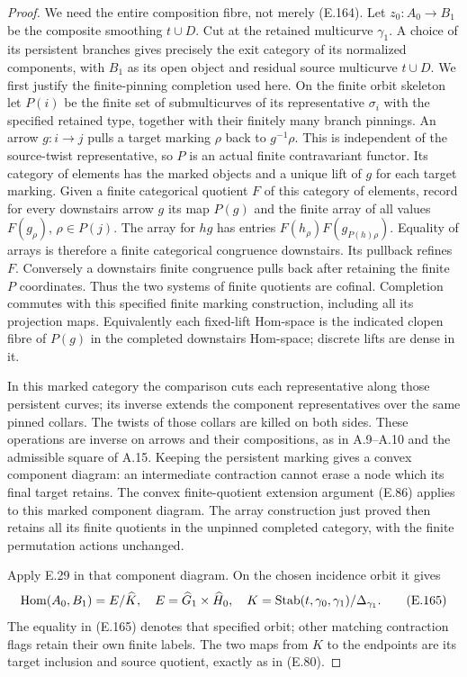 \begin{proof}
We need the entire composition fibre, not merely (E.164).
Let $z_0:A_0\to B_1$ be the composite smoothing $t\cup D$.
Cut at the retained multicurve $\gamma_1$.  A choice of its
persistent branches gives precisely the exit category of its
normalized components, with $B_1$ as its open object and residual
source multicurve $t\cup D$.  We first justify the finite-pinning completion used here.  On
the finite orbit skeleton let $P(i)$ be the finite set of
submulticurves of its representative $\sigma_i$ with the
specified retained type, together with their finitely many
branch pinnings.  An arrow $g:i\to j$ pulls a target marking
$\rho$ back to $g^{-1}\rho$.  This is independent of the
source-twist representative, so $P$ is an actual finite
contravariant functor.  Its category of elements has the
marked objects and a unique lift of $g$ for each target
marking.  Given a finite categorical quotient $F$ of this
category of elements, record for every downstairs arrow $g$
its map $P(g)$ and the finite array of all values
$F(g_\rho)$, $\rho\in P(j)$.  The array for $hg$ has
entries
$F(h_\rho)F(g_{P(h)\rho})$.
Equality of arrays is therefore a finite categorical
congruence downstairs.  Its pullback refines $F$.
Conversely a downstairs finite congruence pulls back after
retaining the finite $P$ coordinates.  Thus the two systems
of finite quotients are cofinal.  Completion commutes with
this specified finite marking construction, including all
its projection maps.  Equivalently each fixed-lift Hom-space
is the indicated clopen fibre of $P(g)$ in the completed
downstairs Hom-space; discrete lifts are dense in it.

In this marked category the comparison cuts each
representative along those persistent curves; its inverse extends
the component representatives over the same pinned collars.
The twists of those collars are killed on both sides.  These
operations are inverse on arrows and their compositions, as in
A.9--A.10 and the admissible square of A.15.  Keeping the
persistent marking gives a convex component diagram: an
intermediate contraction cannot erase a node which its final
target retains.  The convex finite-quotient
extension argument (E.86) applies to this marked component
diagram.  The array construction just proved then retains
all its finite quotients in the unpinned completed category,
with the finite permutation actions unchanged.

Apply E.29 in that component diagram.  On the chosen incidence
orbit it gives
\[
 \operatorname{Hom}(A_0,B_1)=E/\widehat K,
 \quad E=\widehat G_1\times\widehat H_0,
 \quad K=\operatorname{Stab}(t,\gamma_0,\gamma_1)/\Delta_{\gamma_1}.        \tag{E.165}
\]
The equality in (E.165) denotes that specified orbit; other
matching contraction flags retain their own finite labels.
The two maps from $K$ to the endpoints are its target inclusion
and source quotient, exactly as in (E.80).


\end{proof}

